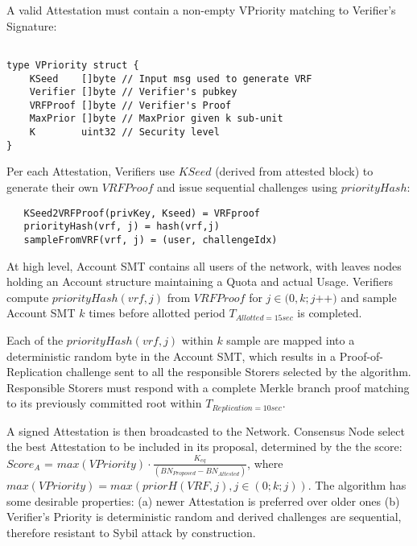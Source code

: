 \documentclass[journal]{IEEEtran}
\begin{document}
A valid Attestation must contain a non-empty VPriority matching to Verifier's Signature:

\begin{footnotesize}
\begin{verbatim}

type VPriority struct {
    KSeed    []byte // Input msg used to generate VRF
    Verifier []byte // Verifier's pubkey
    VRFProof []byte // Verifier's Proof
    MaxPrior []byte // MaxPrior given k sub-unit
    K        uint32 // Security level
}

\end{verbatim}
\end{footnotesize}

Per each Attestation, Verifiers use $KSeed$ (derived from attested block) to generate their own $VRFProof$ and issue sequential challenges using $priorityHash$:

\begin{footnotesize}
\begin{verbatim}
   KSeed2VRFProof(privKey, Kseed) = VRFproof
   priorityHash(vrf, j) = hash(vrf,j)
   sampleFromVRF(vrf, j) = (user, challengeIdx)
\end{verbatim}
\end{footnotesize}

At high level, Account SMT contains all users of the network, with leaves nodes holding an Account structure maintaining a Quota and actual Usage. Verifiers compute   $priorityHash(vrf,j)$ from $VRFProof$ for $j \in (0,k;j$++$)$ and sample Account SMT $k$ times before allotted period $T_{Allotted=15sec}$ is completed.

Each of the $priorityHash(vrf,j)$ within $k$ sample are mapped into a deterministic random byte in the Account SMT, which results in a Proof-of-Replication challenge sent to all the responsible Storers selected by the algorithm. Responsible Storers must respond with a complete Merkle branch proof matching to its previously committed root within $T_{Replication=10sec}$.

A signed Attestation is then broadcasted to the Network. Consensus Node select the best Attestation to be included in its proposal, determined by the the score:
\newline $Score_{A}$ = $max(VPriority) \cdot \frac{K_{eq}}{ (BN_{Proposed}- BN_{Attested})}$, where
\newline $max(VPriority) = max(priorH(VRF,j),j \in (0;k; j))$. The algorithm has some desirable properties: (a) newer Attestation is preferred over older ones (b) Verifier's Priority is deterministic random and derived challenges are sequential, therefore resistant to Sybil attack by construction.
\end{document}
